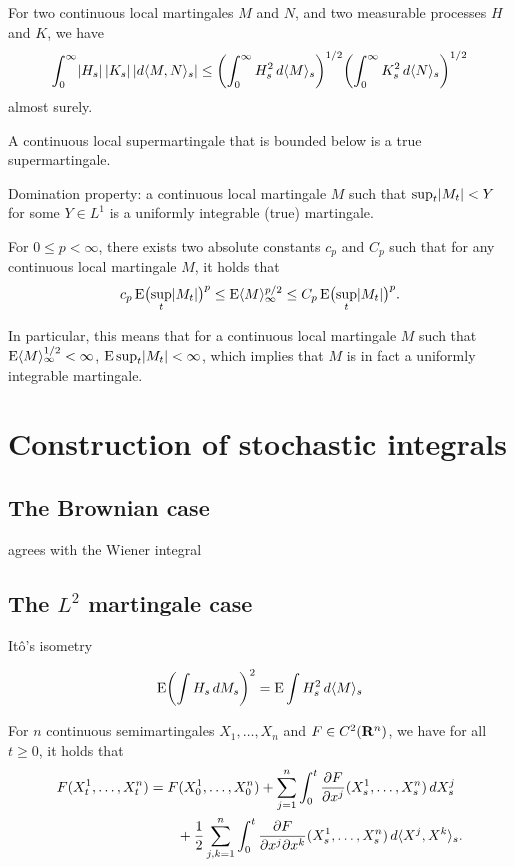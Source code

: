 \documentclass[10pt]{book}
\begin{document}
\begin{namedthm}
    For two continuous local martingales $M$ and $N$, and two measurable processes $H$ and $K$, we have \[
        \int_0^\infty \lvert H_s \rvert\,\lvert K_s \rvert\,\lvert d\langle M, N \rangle_s \rvert \leq \biggl(\int_0^\infty H_s^2 \,d\langle M \rangle_s\biggr)^{1/2} \biggl(\int_0^\infty K_s^2 \,d\langle N \rangle_s\biggr)^{1/2}
    \] almost surely.
\end{namedthm}

A continuous local supermartingale that is bounded below is a true supermartingale.

Domination property: a continuous local martingale $M$ such that $\sup_t \lvert M_t \rvert < Y$ for some $Y \in L^1$ is a uniformly integrable (true) martingale.

\begin{namedthm}
    For $0\leq p < \infty$, there exists two absolute constants $c_p$ and $C_p$ such that for any continuous local martingale $M$, it holds that \[
        c_p \mathop{}\!\mathrm{E} \bigl(\sup_t \lvert M_t \rvert\bigr)^p \leq \mathop{}\!\mathrm{E} \langle M \rangle_\infty^{p/2} \leq C_p \mathop{}\!\mathrm{E} \bigl(\sup_t \lvert M_t \rvert\bigr)^p.
    \]
\end{namedthm}

In particular, this means that for a continuous local martingale $M$ such that $\mathop{}\!\mathrm{E} \langle M \rangle_\infty^{1/2} < \infty$, $\mathop{}\!\mathrm{E} \sup_t \lvert M_t \rvert < \infty$, which implies that $M$ is in fact a uniformly integrable martingale.

\section{Construction of stochastic integrals}
\subsection{The Brownian case}

agrees with the Wiener integral 

\subsection{The \texorpdfstring{$L^2$}{L2} martingale case}

Itô's isometry

\[\mathop{}\!\mathrm{E}\biggl(\int H_s \,dM_s\biggr)^2 = \mathop{}\!\mathrm{E} \int H_s^2\,d\langle M \rangle_s\]

\begin{namedthm}
    For $n$ continuous semimartingales $X_1,\dotsc,X_n$ and $F\in C^2(\mathbf{R}^n)$, we have for all $t \geq 0$, it holds that \begin{align*}
        F(X_t^1,\dotsc,X_t^n) & = F(X_0^1,\dotsc,X_0^n) + \sum_{j=1}^n \int _0^t \frac{\partial F}{\partial x^j} (X_s^1,\dotsc,X_s^n)\,dX_s^j \\
        & \qquad + \frac{1}{2}\sum_{j,k=1}^n \int _0^t \frac{\partial F}{\partial x^j\partial x^k} (X_s^1,\dotsc,X_s^n)\,d\langle X^j, X^k \rangle_s.
    \end{align*}
\end{namedthm}
\end{document}
